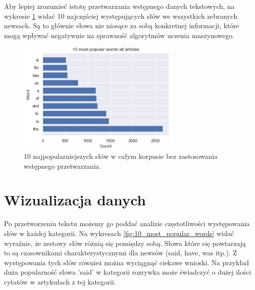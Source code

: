 Aby lepiej zrozumieć istotę przetwarzania wstępnego danych tekstowych, na wykresie \ref{wykr:slowa_bez_pre} widać 10 najczęściej występujących słów we wszystkich zebranych newsach. Są to głównie słowa nie niosące za sobą konkretnej informacji, które mogą wpływać negatywnie na sprawność algorytmów uczenia maszynowego. 

    \begin{figure}[H]
    \includegraphics[width=8cm]{images/analiza/all_unprocessed.png}
    \centering
    \caption{10 najpopularniejszych słów w całym korpusie bez zastosowania wstępnego przetwarzania.}
    \label{wykr:slowa_bez_pre}
    \end{figure} 

\section{Wizualizacja danych}

Po przetworzeniu tekstu możemy go poddać analizie częstotliwości występowania słów w każdej kategorii. Na wykresach \ref{fig:10_most_popular_words} widać wyraźnie, że zestawy słów różnią się pomiędzy sobą. Słowa które się powtarzają to są czasownikami charakterystycznymi dla newsów (said, have, was itp.). Z występowania tych słów również można wyciągnąć ciekawe wnioski. Na przykład duża popularność słowa 'said' w kategorii rozrywka może świadczyć o dużej ilości cytatów w artykułach z tej kategorii.

